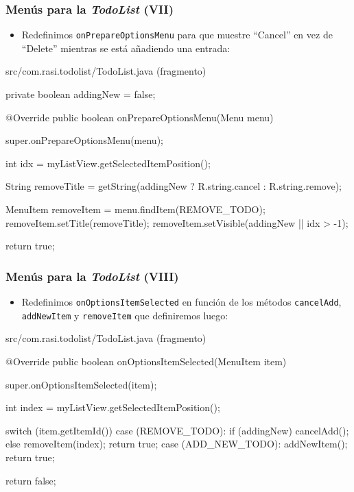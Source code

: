 \documentclass[hyperref={pdfpagelabels=true},ucs]{beamer}
\begin{document}
\begin{frame}[fragile]
\frametitle{Menús para la \emph{TodoList} (VII)}

\begin{itemize}
\item Redefinimos \verb|onPrepareOptionsMenu| para que muestre
  ``Cancel'' en vez de ``Delete'' mientras se está añadiendo una
  entrada:
\end{itemize}

\begin{tiny}
\begin{block}{src/com.rasi.todolist/TodoList.java (fragmento)}
\begin{java}
private boolean addingNew = false;

@Override
public boolean onPrepareOptionsMenu(Menu menu) {
  super.onPrepareOptionsMenu(menu);

  int idx = myListView.getSelectedItemPosition();

  String removeTitle = getString(addingNew ?
                                 R.string.cancel : R.string.remove);

  MenuItem removeItem = menu.findItem(REMOVE_TODO);
  removeItem.setTitle(removeTitle);
  removeItem.setVisible(addingNew || idx > -1);

  return true;
}
\end{java}
\end{block}
\end{tiny}

\end{frame}



\begin{frame}[fragile,shrink=5]
\frametitle{Menús para la \emph{TodoList} (VIII)}

\begin{itemize}
\item Redefinimos \verb|onOptionsItemSelected| en función de los
  métodos \verb|cancelAdd|, \verb|addNewItem| y \verb|removeItem| que
  definiremos luego:
\end{itemize}

\begin{tiny}
\begin{block}{src/com.rasi.todolist/TodoList.java (fragmento)}
\begin{java}
@Override
public boolean onOptionsItemSelected(MenuItem item) {
  super.onOptionsItemSelected(item);

  int index = myListView.getSelectedItemPosition();

  switch (item.getItemId()) {
    case (REMOVE_TODO): {
      if (addingNew) {
        cancelAdd();
      }
      else {
        removeItem(index);
      }
      return true;
    }
    case (ADD_NEW_TODO): {
      addNewItem();
      return true;
    }
  }

  return false;
}
\end{java}
\end{block}
\end{tiny}

\end{frame}
\end{document}
